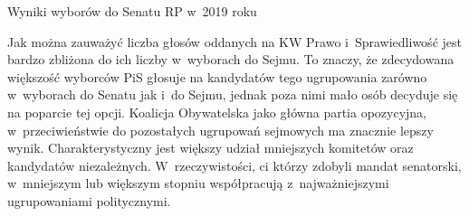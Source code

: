 \begin{table}[h!]
\caption{Wyniki wyborów do Senatu RP w~2019 roku}
\caption*{Źródło: \url{sejmsenat2019.pkw.gov.pl}}
\end{table}

Jak można zauważyć liczba głosów oddanych na KW Prawo i~Sprawiedliwość jest bardzo zbliżona do ich liczby w~wyborach do Sejmu. To znaczy, że zdecydowana większość wyborców PiS głosuje na kandydatów tego ugrupowania zarówno w~wyborach do Senatu jak i~do Sejmu, jednak poza nimi mało osób decyduje się na poparcie tej opcji. Koalicja Obywatelska jako główna partia opozycyjna, w~przeciwieństwie do pozostałych ugrupowań sejmowych ma znacznie lepszy wynik. Charakterystyczny jest większy udział mniejszych komitetów oraz kandydatów niezależnych. W~rzeczywistości, ci którzy zdobyli mandat senatorski, w~mniejszym lub większym stopniu współpracują z~najważniejszymi ugrupowaniami politycznymi.